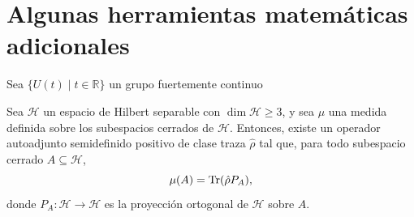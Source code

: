 \documentclass[openany, 11pt]{book}
\numberwithin{equation}{chapter}
\begin{document}
\appendix

\chapter{Algunas herramientas matemáticas adicionales}

\begin{theorem}[Stone]
    Sea $\{U(t)\mid t\in\mathbb R\}$ un grupo fuertemente continuo 
\end{theorem}

\begin{theorem}[Gleason]
    Sea $\mathcal H$ un espacio de Hilbert separable con $\dim\mathcal H\geq 3$, y sea 
    $\mu$ una medida definida sobre los subespacios cerrados de $\mathcal H$. Entonces, existe un operador 
    autoadjunto semidefinido positivo de clase traza $\hat \rho$ tal que, para todo subespacio cerrado $A\subseteq \mathcal H$,\begin{equation}
        \mu(A) = \Tr(\hat \rho P_A),
    \end{equation}donde $P_A:\mathcal H\to\mathcal H$ es la proyección ortogonal de $\mathcal H$ sobre $A$.
\end{theorem}
\end{document}
